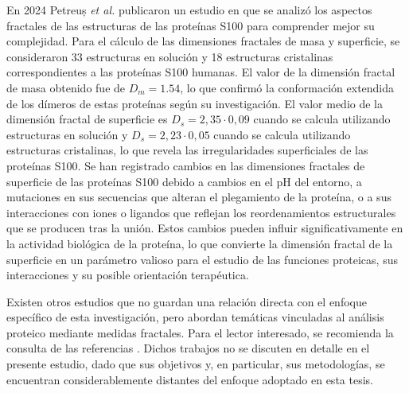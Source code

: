 En 2024 Petreuș \textit{et al.} publicaron un estudio en que se analizó los aspectos fractales de las estructuras de las proteínas S100 para comprender mejor su complejidad. Para el cálculo de las dimensiones fractales de masa y superficie, se consideraron 33 estructuras en solución y 18 estructuras cristalinas correspondientes a las proteínas S100 humanas. El valor de la dimensión fractal de masa obtenido fue de $D_m = 1.54$, lo que confirmó la conformación extendida de los dímeros de estas proteínas según su investigación. El valor medio de la dimensión fractal de superficie es $D_s = 2,35 \cdot 0,09 $ cuando se calcula utilizando estructuras en solución y $D_s = 2,23 \cdot 0,05$ cuando se calcula utilizando estructuras cristalinas, lo que revela las irregularidades superficiales de las proteínas S100. Se han registrado cambios en las dimensiones fractales de superficie de las proteínas S100 debido a cambios en el pH del entorno, a mutaciones en sus secuencias que alteran el plegamiento de la proteína, o a sus interacciones con iones o ligandos que reflejan los reordenamientos estructurales que se producen tras la unión. Estos cambios pueden influir significativamente en la actividad biológica de la proteína, lo que convierte la dimensión fractal de la superficie en un parámetro valioso para el estudio de las funciones proteicas, sus interacciones y su posible orientación terapéutica. 

Existen otros estudios que no guardan una relación directa con el enfoque específico de esta investigación, pero abordan temáticas vinculadas al análisis proteico mediante medidas fractales. Para el lector interesado, se recomienda la consulta de las referencias \cite{Shen2001, Banerji2013, Sendker2024}. Dichos trabajos no se discuten en detalle en el presente estudio, dado que sus objetivos y, en particular, sus metodologías, se encuentran considerablemente distantes del enfoque adoptado en esta tesis.

\color{black}